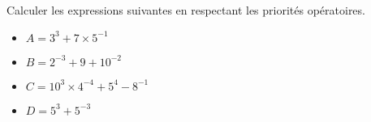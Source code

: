 \begin{exercice*}    
    Calculer les expressions suivantes en respectant les priorités opératoires.
    \begin{multicols}{2}
        \begin{itemize}
            \item[] $A=3^3+7\times 5^{-1}$
            \item[] $B=2^{-3}+9+10^{-2}$
            \item[] $C=10^3\times 4^{-4} + 5^4 - 8^{-1}$
            \item[] $D=5^3+5^{-3}$            
        \end{itemize}
    \end{multicols}
    
\end{exercice*}
